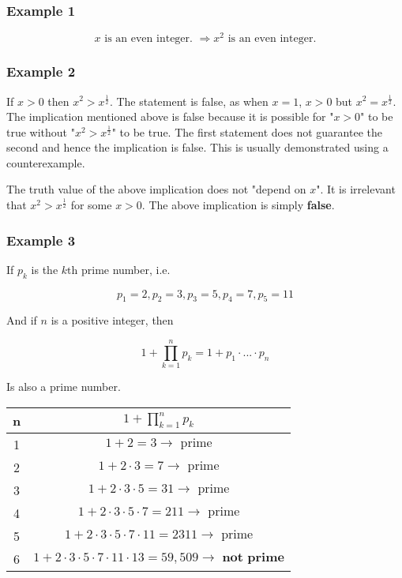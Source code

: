 \documentclass[11pt]{article}
\begin{document}
\subsubsection{Example 1}
\label{sec:org621f90e}

\[x \text{ is an even integer. } \Rightarrow x^2 \text{ is an even integer.}\]

\subsubsection{Example 2}
\label{sec:orgeac8822}

If \(x > 0\) then \(x^2 > x^\frac{1}{2}\). The statement is false, as when \(x = 1\), \(x > 0\) but \(x^2 = x^\frac{1}{2}\). The implication mentioned above is false because it is possible for "\(x > 0\)" to be true without "\(x^2 > x^\frac{1}{2}\)" to be true. The first statement does not guarantee the second and hence the implication is false. This is usually demonstrated using a counterexample.

The truth value of the above implication does not "depend on \(x\)". It is irrelevant that \(x^2 > x^\frac{1}{2}\) for some \(x > 0\). The above implication is simply \textbf{false}.

\newpage

\subsubsection{Example 3}
\label{sec:org06126c3}

If \(p_k\) is the \(k \text{th}\) prime number, i.e.

\[p_1 = 2, p_2 = 3, p_3 = 5, p_4 = 7, p_5 = 11\]

And if \(n\) is a positive integer, then

\[1 + \prod_{k=1}^{n} p_k = 1 + p_1 \cdot ... \cdot p_n\]

Is also a prime number.


\begin{center}
\begin{tabular}{ c|c }
n & \(1 + \prod_{k=1}^{n} p_k\) \\
\hline
1 & \(1 + 2 = 3 \rightarrow \text{ prime}\) \\
2 & \(1 + 2 \cdot 3 = 7 \rightarrow \text{ prime}\) \\
3 & \(1 + 2 \cdot 3 \cdot 5 = 31 \rightarrow \text{ prime}\) \\
4 & \(1 + 2 \cdot 3 \cdot 5 \cdot 7 = 211 \rightarrow \text{ prime}\) \\
5 & \(1 + 2 \cdot 3 \cdot 5 \cdot 7 \cdot 11 = 2311 \rightarrow \text{ prime}\) \\
6 & \(1 + 2 \cdot 3 \cdot 5 \cdot 7 \cdot 11 \cdot 13 = 59,509 \rightarrow \textbf{ not prime}\)\\
\end{tabular}
\end{center}
\end{document}

